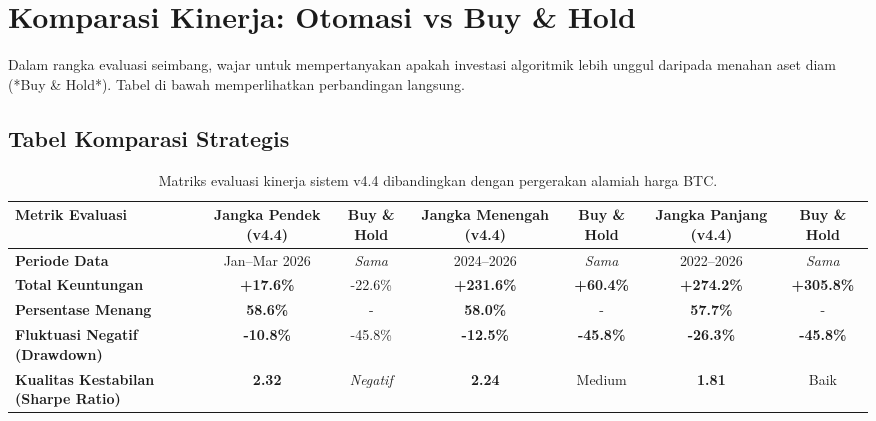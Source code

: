 \documentclass[a4paper,11pt]{article}
\begin{document}
\section{Komparasi Kinerja: Otomasi vs Buy \& Hold}
Dalam rangka evaluasi seimbang, wajar untuk mempertanyakan apakah investasi algoritmik lebih unggul daripada menahan aset diam (*Buy \& Hold*). Tabel di bawah memperlihatkan perbandingan langsung.

\subsection{Tabel Komparasi Strategis}

\begin{table}[h!]
\centering
\small
\renewcommand{\arraystretch}{1.5}
\begin{tabularx}{\textwidth}{|l|c|c|c|c|c|c|}
\hline
\textbf{Metrik Evaluasi} & \textbf{Jangka Pendek} (v4.4) & \textbf{Buy \& Hold} & \textbf{Jangka Menengah} (v4.4) & \textbf{Buy \& Hold} & \textbf{Jangka Panjang} (v4.4) & \textbf{Buy \& Hold} \\ \hline
\textbf{Periode Data} & Jan--Mar 2026 & \textit{Sama} & 2024--2026 & \textit{Sama} & 2022--2026 & \textit{Sama} \\ \hline
\textbf{Total Keuntungan} & \textbf{+17.6\%} & {\color{loss_red}-22.6\%} & \textbf{+231.6\%} & \textbf{+60.4\%} & \textbf{+274.2\%} & \textbf{+305.8\%} \\ \hline
\textbf{Persentase Menang} & \textbf{58.6\%} & - & \textbf{58.0\%} & - & \textbf{57.7\%} & - \\ \hline
\textbf{Fluktuasi Negatif (Drawdown)}& \textbf{-10.8\%} & {\color{loss_red}-45.8\%} & \textbf{-12.5\%} & \textbf{-45.8\%} & \textbf{-26.3\%} & \textbf{-45.8\%} \\ \hline
\textbf{Kualitas Kestabilan (Sharpe Ratio)}& \textbf{2.32} & \textit{Negatif} & \textbf{2.24} & Medium & \textbf{1.81} & Baik \\ \hline
\end{tabularx}
\caption{Matriks evaluasi kinerja sistem v4.4 dibandingkan dengan pergerakan alamiah harga BTC.}
\end{table}
\end{document}
